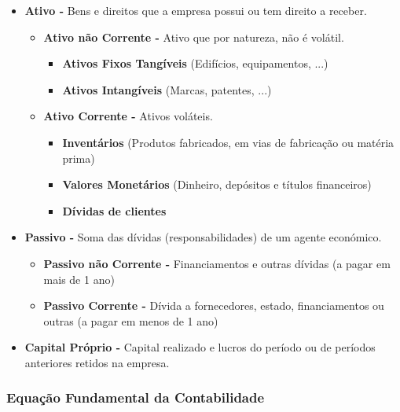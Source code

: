 \documentclass[11pt]{article}
\begin{document}
\begin{itemize}
    \item \textbf{Ativo -} Bens e direitos que a empresa possui ou tem direito a receber.
          \begin{itemize}
              \item \textbf{Ativo não Corrente -} Ativo que por natureza, não é volátil.
                    \begin{itemize}
                        \item \textbf{Ativos Fixos Tangíveis} (Edifícios, equipamentos, ...)
                        \item \textbf{Ativos Intangíveis} (Marcas, patentes, ...)
                    \end{itemize}
              \item \textbf{Ativo Corrente -} Ativos voláteis.
                    \begin{itemize}
                        \item \textbf{Inventários} (Produtos fabricados, em vias de fabricação ou matéria prima)
                        \item \textbf{Valores Monetários} (Dinheiro, depósitos e títulos financeiros)
                        \item \textbf{Dívidas de clientes}
                    \end{itemize}
          \end{itemize}
    \item \textbf{Passivo -} Soma das dívidas (responsabilidades) de um agente económico.
          \begin{itemize}
              \item \textbf{Passivo não Corrente -} Financiamentos e outras dívidas (a pagar em mais de 1 ano)
              \item \textbf{Passivo Corrente -} Dívida a fornecedores, estado, financiamentos ou outras (a pagar em menos de 1 ano)
          \end{itemize}
    \item \textbf{Capital Próprio -} Capital realizado e lucros do período ou de períodos anteriores retidos na empresa.
\end{itemize}

\newpage

\subsubsection*{Equação Fundamental da Contabilidade}
\end{document}

